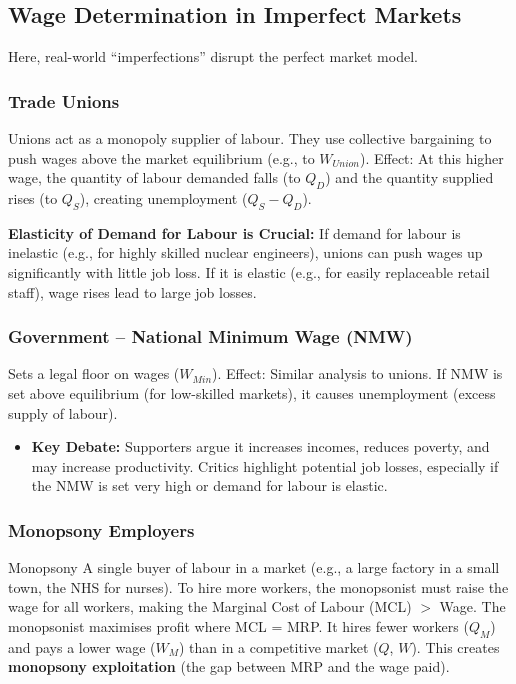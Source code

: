 \documentclass[11pt, a4paper, twoside]{book}
\begin{document}
\subsection{Wage Determination in Imperfect Markets}

Here, real-world ``imperfections'' disrupt the perfect market model.

\subsubsection{Trade Unions}

Unions act as a monopoly supplier of labour. They use collective bargaining to push wages above the market equilibrium (e.g., to $W_{Union}$). Effect: At this higher wage, the quantity of labour demanded falls (to $Q_D$) and the quantity supplied rises (to $Q_S$), creating unemployment ($Q_S - Q_D$).

\textbf{Elasticity of Demand for Labour is Crucial:} If demand for labour is inelastic (e.g., for highly skilled nuclear engineers), unions can push wages up significantly with little job loss. If it is elastic (e.g., for easily replaceable retail staff), wage rises lead to large job losses.

\subsubsection{Government -- National Minimum Wage (NMW)}

Sets a legal floor on wages ($W_{Min}$). Effect: Similar analysis to unions. If NMW is set above equilibrium (for low-skilled markets), it causes unemployment (excess supply of labour).

\begin{itemize}
  \item \textbf{Key Debate:} Supporters argue it increases incomes, reduces poverty, and may increase productivity. Critics highlight potential job losses, especially if the NMW is set very high or demand for labour is elastic.
\end{itemize}

\subsubsection{Monopsony Employers}

\begin{keyterm}{Monopsony}
A single buyer of labour in a market (e.g., a large factory in a small town, the NHS for nurses). To hire more workers, the monopsonist must raise the wage for all workers, making the Marginal Cost of Labour (MCL) $>$ Wage. The monopsonist maximises profit where MCL = MRP. It hires fewer workers ($Q_M$) and pays a lower wage ($W_M$) than in a competitive market ($Q$, $W$). This creates \textbf{monopsony exploitation} (the gap between MRP and the wage paid).
\end{keyterm}
\end{document}
